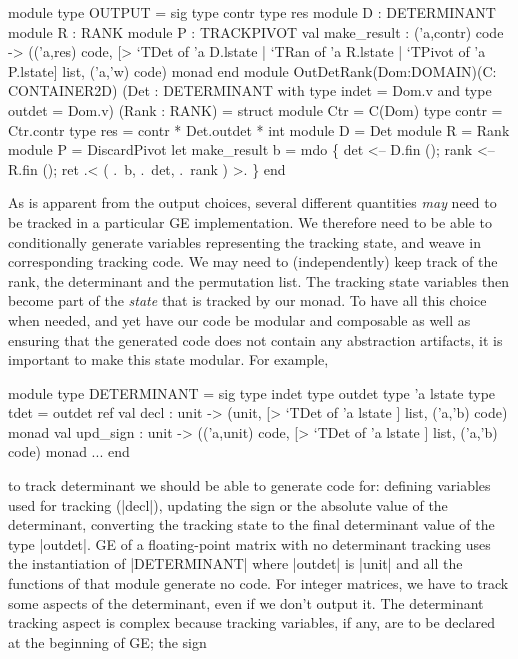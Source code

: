 \documentclass{llncs}
\begin{document}
\begin{code2}
module type OUTPUT = sig
  type contr  type res
  module D : DETERMINANT   module R : RANK   module P : TRACKPIVOT
  val make_result : ('a,contr) code -> 
    (('a,res) code,
     [> `TDet of 'a D.lstate | `TRan of 'a R.lstate | `TPivot of 'a P.lstate]
       list, ('a,'w) code) monad
end
module OutDetRank(Dom:DOMAIN)(C: CONTAINER2D)
    (Det : DETERMINANT with type indet = Dom.v and type outdet = Dom.v)
    (Rank : RANK) = struct
  module Ctr = C(Dom)
  type contr = Ctr.contr
  type res = contr * Det.outdet * int
  module D = Det   module R = Rank   module P = DiscardPivot
  let make_result b = mdo \{ det  <-- D.fin ();  rank <-- R.fin ();
    ret .< ( .~b, .~det, .~rank ) >. \}
end
\end{code2}

As is apparent from the output choices, several different quantities
\emph{may} need to be tracked in a particular GE implementation.  We
therefore need to be able to conditionally generate variables
representing the tracking state, and weave in corresponding tracking
code. We may need to (independently) keep track of the rank, the
determinant and the permutation list.  The tracking state variables
then become part of the \emph{state} that is tracked by our monad.  To
have all this choice when needed, and yet have our code be modular and
composable as well as ensuring that the generated code does not
contain any abstraction artifacts, it is important to make this state
modular.  For example,
\begin{code}
module type DETERMINANT = sig
  type indet  type outdet  type 'a lstate
  type tdet = outdet ref   
  val decl : unit -> 
    (unit, [> `TDet of 'a lstate ] list, ('a,'b) code) monad
  val upd_sign : unit -> 
    (('a,unit) code, [> `TDet of 'a lstate ] list, ('a,'b) code) monad
  ...
end
\end{code}
\noindent  to track determinant we should be able to generate code
for: defining variables used for tracking (|decl|),
updating the sign or the absolute
value of the determinant, converting the tracking state
to the final determinant value of the type |outdet|. GE of a
floating-point matrix with no determinant tracking uses the
instantiation of |DETERMINANT| where |outdet| is |unit| and all the
functions of that module generate no code. For integer matrices, we
have to track some aspects of the determinant, even if we don't output
it. The determinant tracking aspect is complex because tracking
variables, if any, are to be declared at the beginning of GE; the sign
\end{document}
